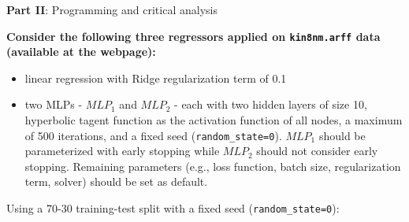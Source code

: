 \documentclass[12pt]{article}
\begin{document}
\pagebreak

\begin{center}
    \large{\textbf{Part II}: Programming and critical analysis}
\end{center}

{\color{questioncolor}\bfseries
\noindent
Consider the following three regressors applied on \texttt{kin8nm.arff} data
(available at the webpage):
\begin{itemize}
    \item linear regression with Ridge regularization term of 0.1
    \item two MLPs - $MLP_1$ and $MLP_2$ - each with two hidden layers of
          size 10, hyperbolic tagent function as the activation function of all nodes,
          a maximum of 500 iterations, and a fixed seed (\texttt{random\_state=0}).
          $MLP_1$ should be parameterized with early stopping while $MLP_2$ should not
          consider early stopping.
          Remaining parameters (e.g., loss function, batch size, regularization term,
          solver) should be set as default.
\end{itemize}
Using a 70-30 training-test split with a fixed seed (\texttt{random\_state=0}):
}
\end{document}
